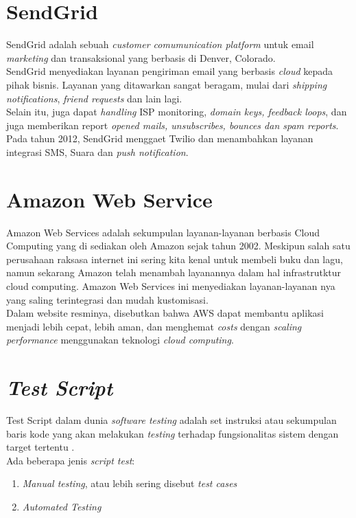    \section{SendGrid}
   SendGrid adalah sebuah \textit{customer comumunication platform} untuk email \textit{marketing} dan transaksional yang berbasis di Denver, Colorado.
   \\ \indent
   SendGrid menyediakan layanan pengiriman email yang berbasis \textit{cloud} kepada pihak bisnis. Layanan yang ditawarkan sangat beragam, mulai dari \textit{shipping notifications}, \textit{friend requests} dan lain lagi. \\ \indent
   Selain itu, juga dapat \textit{handling} ISP monitoring, \textit{domain keys, feedback loops}, dan juga memberikan report \textit{opened mails, unsubscribes, bounces dan spam reports}. Pada tahun 2012, SendGrid menggaet Twilio dan menambahkan layanan integrasi SMS, Suara dan \textit{push notification}. \cite{wikipedia_sendgrid_2017}
   
   \section{Amazon Web Service}
	Amazon Web Services adalah sekumpulan layanan-layanan berbasis Cloud Computing yang di sediakan oleh Amazon sejak tahun 2002. Meskipun salah satu perusahaan raksasa internet ini sering kita kenal untuk membeli buku dan lagu, namun sekarang Amazon telah menambah layanannya dalam hal infrastrutktur cloud computing. Amazon Web Services ini menyediakan layanan-layanan nya yang saling terintegrasi dan mudah kustomisasi\cite{wikipedia_amazon_2016}.
	\\ \indent
	Dalam website resminya, disebutkan bahwa AWS dapat membantu aplikasi menjadi lebih cepat, lebih aman, dan menghemat \textit{costs} dengan \textit{scaling} \textit{performance} menggunakan teknologi \textit{cloud computing}\cite{web_services_amazon_nodate}.
   
   
   \section{\textit{Test Script}}
   Test Script dalam dunia \textit{software testing} adalah set instruksi atau sekumpulan baris kode yang akan melakukan \textit{testing} terhadap fungsionalitas sistem dengan target tertentu \cite{noauthor_test_2016}.
   \\ \indent Ada beberapa jenis \textit{script test}:
   \begin{enumerate}
   	\item \textit{Manual testing}, atau lebih sering disebut \textit{test cases}
   	\item \textit{Automated Testing}
   \end{enumerate}
   
